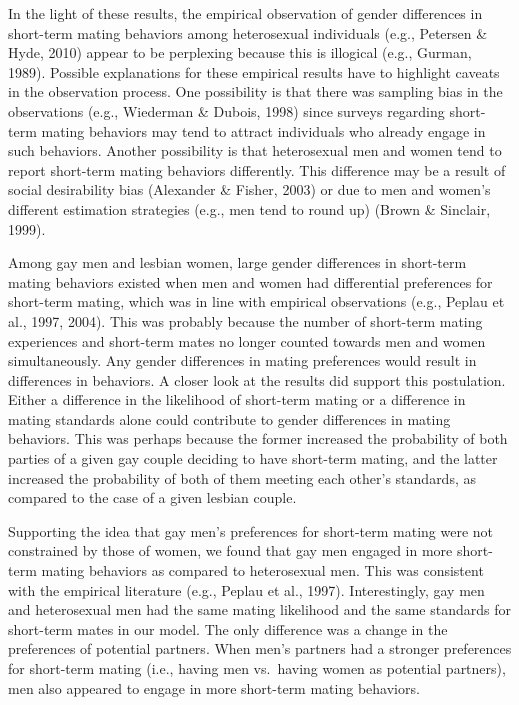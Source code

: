 \documentclass[
  11pt,
]{article}
\begin{document}
In the light of these results, the empirical observation of gender
differences in short-term mating behaviors among heterosexual
individuals (e.g., Petersen \& Hyde, 2010) appear to be perplexing
because this is illogical (e.g., Gurman, 1989). Possible explanations
for these empirical results have to highlight caveats in the observation
process. One possibility is that there was sampling bias in the
observations (e.g., Wiederman \& Dubois, 1998) since surveys regarding
short-term mating behaviors may tend to attract individuals who already
engage in such behaviors. Another possibility is that heterosexual men
and women tend to report short-term mating behaviors differently. This
difference may be a result of social desirability bias (Alexander \&
Fisher, 2003) or due to men and women's different estimation strategies
(e.g., men tend to round up) (Brown \& Sinclair, 1999).

Among gay men and lesbian women, large gender differences in short-term
mating behaviors existed when men and women had differential preferences
for short-term mating, which was in line with empirical observations
(e.g., Peplau et al., 1997, 2004). This was probably because the number
of short-term mating experiences and short-term mates no longer counted
towards men and women simultaneously. Any gender differences in mating
preferences would result in differences in behaviors. A closer look at
the results did support this postulation. Either a difference in the
likelihood of short-term mating or a difference in mating standards
alone could contribute to gender differences in mating behaviors. This
was perhaps because the former increased the probability of both parties
of a given gay couple deciding to have short-term mating, and the latter
increased the probability of both of them meeting each other's
standards, as compared to the case of a given lesbian couple.

Supporting the idea that gay men's preferences for short-term mating
were not constrained by those of women, we found that gay men engaged in
more short-term mating behaviors as compared to heterosexual men. This
was consistent with the empirical literature (e.g., Peplau et al.,
1997). Interestingly, gay men and heterosexual men had the same mating
likelihood and the same standards for short-term mates in our model. The
only difference was a change in the preferences of potential partners.
When men's partners had a stronger preferences for short-term mating
(i.e., having men vs.~having women as potential partners), men also
appeared to engage in more short-term mating behaviors.
\end{document}

